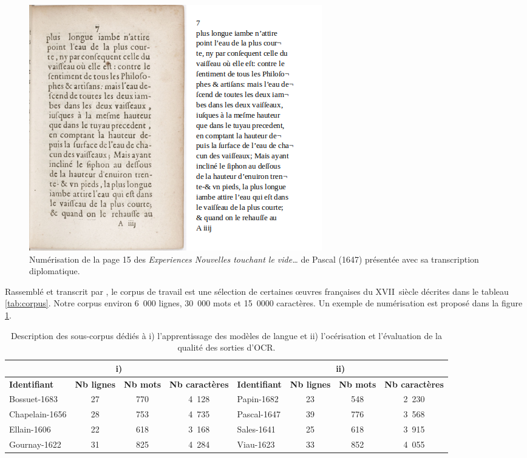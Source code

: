 \documentclass[10pt,twoside]{article}
\begin{document}
    \begin{figure}[htbp] 
    \begin{center} 
    \includegraphics[scale=0.5]{pascal_15_img_transcription.png}
    \end{center} 
    \caption{Numérisation de la page 15 des \textit{Experiences Nouvelles touchant le vide…} de Pascal (1647) 
    présentée avec sa transcription diplomatique.} \label{pascal}
    \end{figure}

    Rassemblé et transcrit par \cite{Gabay2019a},
    le corpus de travail est une sélection de certaines \oe{}uvres françaises du XVII\ieme~siècle 
    décrites dans le tableau \ref{tab:corpus}. Notre corpus environ 6~000 lignes, 30~000 mots et 15~0000 caractères. 
    Un exemple de numérisation est proposé dans la figure \ref{pascal}.

    \begin{table}[h]
    \begin{center}
    \begin{footnotesize}
    {\setlength{\tabcolsep}{0.1cm}
    \begin{tabular}{|l|c|c|c|l|c|c|c|}
    \hline
    \multicolumn{4}{|c}{i)}&\multicolumn{4}{|c|}{ii)}\\\hline
    \textbf{Identifiant}&\textbf{Nb lignes}&\textbf{Nb mots}&\textbf{Nb caractères}&\textbf{Identifiant}&\textbf{Nb lignes}&\textbf{Nb mots}&\textbf{Nb caractères}\\ \hline
    Bossuet-1683&27&770&4~128&Papin-1682&23&548&2~230\\ \hline
    Chapelain-1656&28&753&4~735&Pascal-1647&39&776&3~568\\ \hline
    Ellain-1606&22&618&3~168&Sales-1641&25&618&3~915\\ \hline
    Gournay-1622&31&825&4~284&Viau-1623&33&852&4~055\\\hline
    \end{tabular}}
    \caption{Description des sous-corpus dédiés à i) l'apprentissage des modèles de langue et ii) l'océrisation
    et l'évaluation de la qualité des sorties d'OCR.} \label{tab:souscorpus}
    \end{footnotesize}
    \end{center}
    \end{table} 
\end{document}
